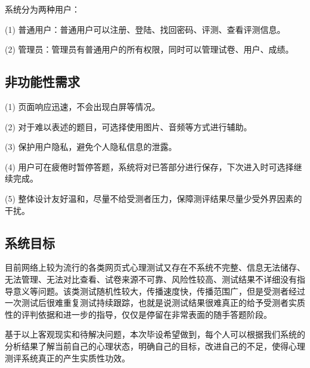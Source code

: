 系统分为两种用户：

(1) 普通用户：普通用户可以注册、登陆、找回密码、评测、查看评测信息。

(2) 管理员：管理员有普通用户的所有权限，同时可以管理试卷、用户、成绩。

\subsection{非功能性需求}

(1) 页面响应迅速，不会出现白屏等情况。

(2) 对于难以表述的题目，可选择使用图片、音频等方式进行辅助。

(3) 保护用户隐私，避免个人隐私信息的泄露。

(4) 用户可在疲倦时暂停答题，系统将对已答部分进行保存，下次进入时可选择继续完成。

(5) 整体设计友好温和，尽量不给受测者压力，保障测评结果尽量少受外界因素的干扰。

\subsection{系统目标}

目前网络上较为流行的各类网页式心理测试又存在不系统不完整、信息无法储存、无法管理、无法对比查看、试卷来源不可靠、风险性较高、测试结果不详细没有指导意义等问题。该类测试随机性较大，传播速度快，传播范围广，但是受测者经过一次测试后很难重复测试持续跟踪，也就是说测试结果很难真正的给予受测者实质性的评判依据和进一步的指导，仅仅是停留在非常表面的随手答题阶段。

基于以上客观现实和待解决问题，本次毕设希望做到，每个人可以根据我们系统的分析结果了解当前自己的心理状态，明确自己的目标，改进自己的不足，使得心理测评系统真正的产生实质性功效。